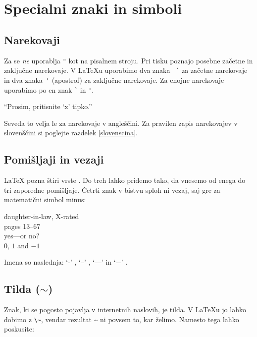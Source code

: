 \section{Specialni znaki in simboli}
 
\subsection{Narekovaji}

Za  se \emph{ne} uporablja \verb|"| 
 kot na pisalnem stroju. Pri tisku poznajo 
posebne začetne in zaključne narekovaje. V \LaTeX{}u
uporabimo dva znaka ~\verb|`| za začetne narekovaje in
dva znaka~\verb|'| (apostrof) za zaključne narekovaje. Za enojne narekovaje 
uporabimo po en znak \verb|`| in \verb|'|.
\begin{example}
``Prosim, pritisnite `x' tipko.''
\end{example}
Seveda to velja le za narekovaje v angleščini. Za pravilen zapis
narekovajev v slovenščini si poglejte razdelek \ref{slovenscina}.

\subsection{Pomišljaji in vezaji}

\LaTeX{} pozna štiri vrste . Do treh lahko pridemo tako, da  vnesemo 
od enega do tri zaporedne pomišljaje. Četrti znak v bistvu sploh ni vezaj, saj gre
za matematični simbol minus: \index{-}
\index{--} \index{---}  

\begin{example}
daughter-in-law, X-rated\\
pages 13--67\\
yes---or no? \\
$0$, $1$ and $-1$
\end{example}
Imena so naslednja: 
`-' , `--' , `---'  in
`$-$' .

\subsection{Tilda ($\sim$)}
Znak, ki se pogosto pojavlja v internetnih naslovih, je tilda. V 
\LaTeX{}u jo lahko dobimo z \verb|\~|, vendar rezultat \~{} ni povsem to, kar želimo. Namesto tega lahko
poskusite:

